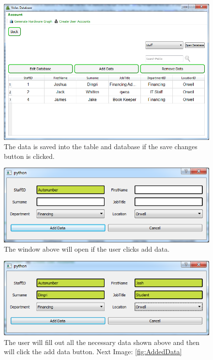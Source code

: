 \begin{figure}[H]
    \includegraphics[width=\textwidth]{./Testing/Images/SaveChanges.png}
    \caption{The data is saved into the table and database if the save changes button is clicked.} \label{fig:SaveChanges}
\end{figure}

\begin{figure}[H]
    \includegraphics[width=\textwidth]{./Testing/Images/AddDataWindow.png}
    \caption{The window above will open if the user clicks add data.} \label{fig:AddDataWindow}
\end{figure}

\begin{figure}[H]
    \includegraphics[width=\textwidth]{./Testing/Images/AddDataDataExample.png}
    \caption{The user will fill out all the necessary data shown above and then will click the add data button. Next Image: \ref{fig:AddedData}} \label{fig:AddDataDataExample}
\end{figure}

